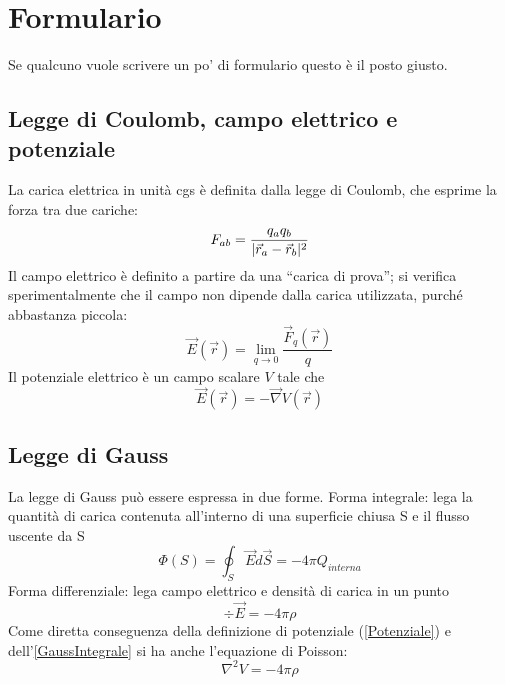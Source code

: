 \documentclass[../main.tex]{subfiles}
\begin{document}
\section{Formulario}
\setcounter{equation}{0}
\renewcommand{\theequation}{F.\arabic{equation}}

Se qualcuno vuole scrivere un po' di formulario questo è il posto giusto.

\subsection{Legge di Coulomb, campo elettrico e potenziale}\label{Preliminari}
La carica elettrica in unit\`a cgs \`e definita dalla legge di Coulomb, che esprime la forza tra due cariche:
\begin{equation}
	\label{Coulomb}
	F_{ab}=\frac{q_aq_b}{\lvert\vec r_a -\vec r_b\rvert^2}
\end{equation}
Il campo elettrico \`e definito a partire da una ``carica di prova''; si verifica sperimentalmente che il campo non dipende dalla carica utilizzata, purch\'e abbastanza piccola:
\begin{equation}
	\label{CampoElettrico}
	\vec E(\vec r)=\lim_{q \to 0} \frac{\vec F_q(\vec r)}{q}
\end{equation}
Il potenziale elettrico \`e un campo scalare $V$ tale che
\begin{equation}
	\label{Potenziale}
	\vec E(\vec r) = - \vec \nabla V(\vec r)
\end{equation}

\subsection{Legge di Gauss}\label{Gauss}
La legge di Gauss pu\`o essere espressa in due forme.\newline
Forma integrale: lega la quantit\`a di carica contenuta all'interno di una superficie chiusa S e il flusso uscente da S
\begin{equation}
	\label{GaussIntegrale}
	\Phi(S)= \oint_S \vec E d\vec S=-4\pi Q_{interna}
\end{equation}
Forma differenziale: lega campo elettrico e densit\`a di carica in un punto 
\begin{equation}
	\label{GaussDifferenziale}
	\div \vec E=-4\pi\rho
\end{equation}
Come diretta conseguenza della definizione di potenziale (\cref{Potenziale}) e dell'\cref{GaussIntegrale} si ha anche l'equazione di Poisson:
\begin{equation}
	\label{Poisson}
	\nabla^2V= -4\pi \rho
\end{equation}
\end{document}
